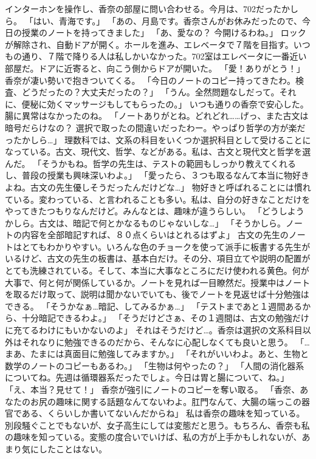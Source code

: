 インターホンを操作し、香奈の部屋に問い合わせる。今月は、702だったかしら。
「はい、青海です。」
「あの、月島です。香奈さんがお休みだったので、今日の授業のノートを持ってきました」
「あ、愛なの？ 今開けるわね。」
ロックが解除され、自動ドアが開く。ホールを進み、エレベータで７階を目指す。いつもの通り、７階で降りる人は私しかいなかった。702室はエレベータに一番近い部屋だ。ドアに近寄ると、向こう側からドアが開いた。
「愛！ありがとう！」
香奈が凄い勢いで抱きついてくる。
「今日のノートのコピー持ってきたわ。検査、どうだったの？大丈夫だったの？」
「うん。全然問題なしだって。それに、便秘に効くマッサージもしてもらったの。」
いつも通りの香奈で安心した。腸に異常はなかったのね。
「ノートありがとね。どれどれ……げっ、また古文は暗号だらけなの？ 選択で取ったの間違いだったわー。やっぱり哲学の方が楽だったかしら…」
理数科では、文系の科目をいくつか選択科目として受けることになっている。古文、現代文、哲学、などがある。私は、古文と現代文と哲学を選んだ。
「そうかもね。哲学の先生は、テストの範囲もしっかり教えてくれるし、普段の授業も興味深いわよ。」
「愛ったら、３つも取るなんて本当に物好きよね。古文の先生優しそうだったんだけどな…」
物好きと呼ばれることには慣れている。変わっている、と言われることも多い。私は、自分の好きなことだけをやってきたつもりなんだけど。みんなとは、趣味が違うらしい。
「どうしようかしら。古文は、暗記で何とかなるものじゃないしな…」
「そうかしら。ノートの内容を全部暗記すれば、８０点くらいはとれるはずよ」
古文の先生のノートはとてもわかりやすい。いろんな色のチョークを使って派手に板書する先生がいるけど、古文の先生の板書は、基本白だけ。その分、項目立てや説明の配置がとても洗練されている。そして、本当に大事なところにだけ使われる黄色。何が大事で、何と何が関係しているか。ノートを見れば一目瞭然だ。授業中はノートを取るだけ取って、説明は聞かないでいても、後でノートを見返せば十分勉強はできる。
「そうかなぁ…暗記、してみるかぁ…」
「テストまであと１週間あるから、十分暗記できるわよ。」
「そうだけどさぁ、その１週間は、古文の勉強だけに充てるわけにもいかないのよ」
それはそうだけど…。香奈は選択の文系科目以外はそれなりに勉強できるのだから、そんなに心配しなくても良いと思う。
「…まあ、たまには真面目に勉強してみますか。」
「それがいいわよ。あと、生物と数学のノートのコピーもあるわ。」
「生物は何やったの？」
「人間の消化器系についてね。先週は循環器系だったでしょ。今日は胃と腸について、ね。」
「え、本当？見せて！」
香奈が強引にノートのコピーを奪い取る。
「香奈、あなたのお尻の趣味に関する話題なんてないわよ。肛門なんて、大腸の端っこの器官である、くらいしか書いてないんだからね」
私は香奈の趣味を知っている。別段騒ぐことでもないが、女子高生にしては変態だと思う。もちろん、香奈も私の趣味を知っている。変態の度合いでいけば、私の方が上手かもしれないが、あまり気にしたことはない。
